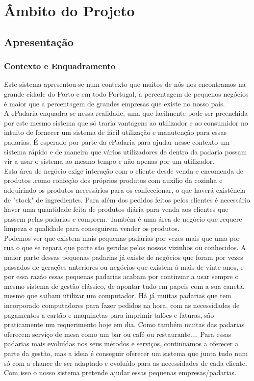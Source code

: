 \chapter{Âmbito do Projeto}
\label{ambito}
\section{Apresentação}
\subsection{Contexto e Enquadramento}
Este sistema apresentou-se num contexto que muitos de nós nos encontramos na grande cidade do Porto e em todo Portugal, a percentagem de pequenos negócios é maior que a percentagem de grandes empresas que existe no nosso país.\\
A ePadaria enquadra-se nessa realidade, uma que facilmente pode ser preenchida por este mesmo sistema que só traria vantagens ao utilizador e ao consumidor no intuito de fornecer um sistema de fácil utilização e manutenção para essas padarias. É esperado por parte da ePadaria para ajudar nesse contexto um sistema rápido e de maneira que vários utilizadores de dentro da padaria possam vir a usar o sistema ao mesmo tempo e não apenas por um utilizador. \\
Esta área de negócio exige interação com o cliente desde venda e encomenda de produtos ,como confeção dos próprios produtos com auxílio da cozinha e adquirindo os produtos necessários para os confeccionar, o que haverá existência de "stock" de ingredientes. Para além dos pedidos feitos pelos clientes é necessário haver uma quantidade feita de produtos diária para venda aos clientes que passem pelas padarias e comprem. Também é uma área de negócio que requere limpeza e qualidade para conseguirem vender os produtos.\\
 Podemos ver que existem mais pequenas padarias por vezes mais que uma por rua o que se repara que parte são geridas pelos nossos vizinhos ou conhecidos. A maior parte dessas pequenas padarias já existe de negócios que foram por vezes passados de gerações anteriores ou negócios que existem á mais de vinte anos, e por essa razão essas pequenas padarias acabam por continuar a usar sempre o mesmo sistema de gestão clássico, de apontar tudo em papeis com a sua caneta, mesmo que saibam utilizar um computador. Há já muitas padarias que tem incorporado computadores para fazer pedidos na hora, com as necessidades de pagamentos a cartão e maquinetas para imprimir talões e faturas, são praticamente um requerimento hoje em dia. Como também muitas das padarias oferecem serviço de mesa como um bar ou café ou restaurante.... Para essas padarias mais evoluídas nos seus métodos e serviços, continuamos a oferecer a parte da gestão, mas a ideia é conseguir oferecer um sistema que junta tudo num só com a chance de ser adaptado e evoluído para as necessidades de cada cliente.
   Com isso o nosso sistema pretende ajudar essas pequenas empresas/padarias.\\




